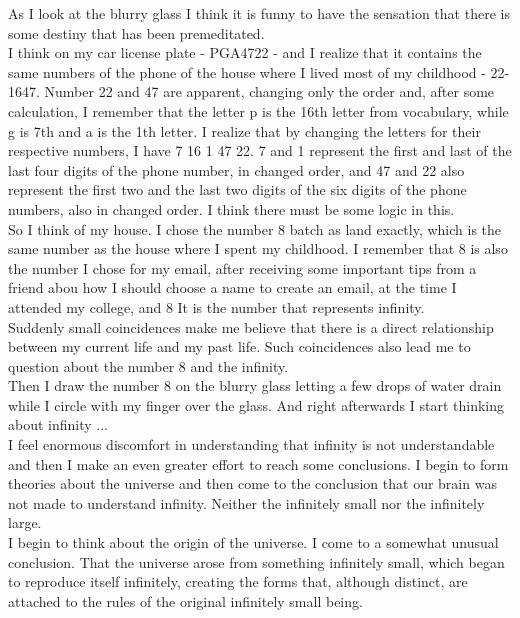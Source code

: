 \documentclass[11pt]{book}
\begin{document}
\noindent As I look at the blurry glass I think it is funny to have the sensation that there is some destiny that has been premeditated. \\

\noindent I think on my car license plate - PGA4722 - and I realize that it contains the same numbers of the phone of the house where I lived most of my childhood - 22-1647. Number 22 and 47 are apparent, changing only the order and, after some calculation, I remember that the letter p is the 16th letter from vocabulary, while g is 7th and a is the 1th letter. I realize that by changing the letters for their respective numbers, I have 7 16 1 47 22. 7 and 1 represent the first and last of the last four digits of the phone number, in changed order, and 47 and 22 also represent the first two and the last two digits of the six digits of the phone numbers, also in changed order. I think there must be some logic in this. \\

\noindent So I think of my house. I chose the number 8 batch as land exactly, which is the same number as the house where I spent my childhood. I remember that 8 is also the number I chose for my email, after receiving some important tips from a friend abou how I should choose a name to create an email, at the time I attended my college, and 8 It is the number that represents infinity. \\

\noindent Suddenly small coincidences make me believe that there is a direct relationship between my current life and my past life. Such coincidences also lead me to question about the number 8 and the infinity. \\

\noindent Then I draw the number 8 on the blurry glass letting a few drops of water drain while I circle with my finger over the glass. And right afterwards I start thinking about infinity ... \\

\noindent I feel enormous discomfort in understanding that infinity is not understandable and then I make an even greater effort to reach some conclusions. I begin to form theories about the universe and then come to the conclusion that our brain was not made to understand infinity. Neither the infinitely small nor the infinitely large. \\

\noindent I begin to think about the origin of the universe. I come to a somewhat unusual conclusion. That the universe arose from something infinitely small, which began to reproduce itself infinitely, creating the forms that, although distinct, are attached to the rules of the original infinitely small being. \\
\end{document}
